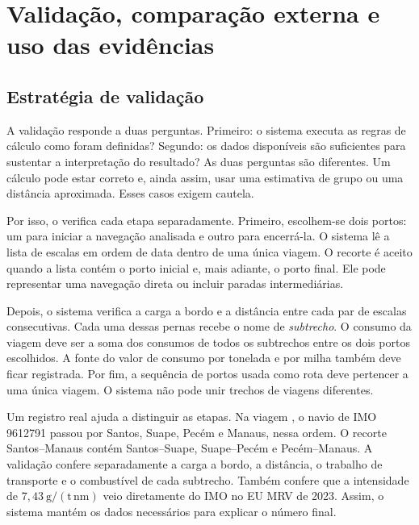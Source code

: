 \chapter{Validação, comparação externa e uso das evidências}
\label{ch:validacao}

\section{Estratégia de validação}
\label{sec:estrategia-validacao}

A validação responde a duas perguntas. Primeiro: o sistema executa as regras de cálculo como foram definidas? Segundo: os dados disponíveis são suficientes para sustentar a interpretação do resultado? As duas perguntas são diferentes. Um cálculo pode estar correto e, ainda assim, usar uma estimativa de grupo ou uma distância aproximada. Esses casos exigem cautela.

Por isso, o \CabotageLens{} verifica cada etapa separadamente. Primeiro, escolhem-se dois portos: um para iniciar a navegação analisada e outro para encerrá-la. O sistema lê a lista de escalas em ordem de data dentro de uma única viagem. O recorte é aceito quando a lista contém o porto inicial e, mais adiante, o porto final. Ele pode representar uma navegação direta ou incluir paradas intermediárias.

Depois, o sistema verifica a carga a bordo e a distância entre cada par de escalas consecutivas. Cada uma dessas pernas recebe o nome de \emph{subtrecho}. O consumo da viagem deve ser a soma dos consumos de todos os subtrechos entre os dois portos escolhidos. A fonte do valor de consumo por tonelada e por milha também deve ficar registrada. Por fim, a sequência de portos usada como rota deve pertencer a uma única viagem. O sistema não pode unir trechos de viagens diferentes.

Um registro real ajuda a distinguir as etapas. Na viagem , o navio de IMO 9612791 passou por Santos, Suape, Pecém e Manaus, nessa ordem. O recorte Santos--Manaus contém Santos--Suape, Suape--Pecém e Pecém--Manaus. A validação confere separadamente a carga a bordo, a distância, o trabalho de transporte e o combustível de cada subtrecho. Também confere que a intensidade de \(7{,}43~\mathrm{g/(t\,nm)}\) veio diretamente do IMO no EU MRV de 2023. Assim, o sistema mantém os dados necessários para explicar o número final.


